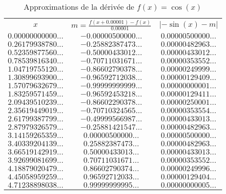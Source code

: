 \begin{table}
\caption{Approximations de la dérivée de $f(x) = \cos(x)$}
\label{TAB_COS_P}
\begin{center}
\begin{tabular}{|c|c|c|}
\cline{1-3}
      $x$                               & $m = \frac{f(x+0.00001)-f(x)}{0.00001}$ &     $|-\sin(x)-m|$                      \\ 
\cline{1-3}
$0.00000000000\ldots$ & $-0.00000500000\ldots$ & $0.00000500000\ldots$ \\ 
$0.26179938780\ldots$ & $-0.25882387473\ldots$ & $0.00000482963\ldots$ \\ 
$0.52359877560\ldots$ & $-0.50000433012\ldots$ & $0.00000433012\ldots$ \\ 
$0.78539816340\ldots$ & $-0.70711031671\ldots$ & $0.00000353552\ldots$ \\ 
$1.04719755120\ldots$ & $-0.86602790378\ldots$ & $0.00000249999\ldots$ \\ 
$1.30899693900\ldots$ & $-0.96592712038\ldots$ & $0.00000129409\ldots$ \\ 
$1.57079632679\ldots$ & $-0.99999999999\ldots$ & $0.00000000001\ldots$ \\ 
$1.83259571459\ldots$ & $-0.96592453218\ldots$ & $0.00000129411\ldots$ \\ 
$2.09439510239\ldots$ & $-0.86602290378\ldots$ & $0.00000250001\ldots$ \\ 
$2.35619449019\ldots$ & $-0.70710324565\ldots$ & $0.00000353554\ldots$ \\ 
$2.61799387799\ldots$ & $-0.49999566987\ldots$ & $0.00000433013\ldots$ \\ 
$2.87979326579\ldots$ & $-0.25881421547\ldots$ & $0.00000482963\ldots$ \\ 
$3.14159265359\ldots$ & $0.00000500000\ldots$ & $0.00000500000\ldots$ \\ 
$3.40339204139\ldots$ & $0.25882387473\ldots$ & $0.00000482963\ldots$ \\ 
$3.66519142919\ldots$ & $0.50000433013\ldots$ & $0.00000433013\ldots$ \\ 
$3.92699081699\ldots$ & $0.70711031671\ldots$ & $0.00000353552\ldots$ \\ 
$4.18879020479\ldots$ & $0.86602790374\ldots$ & $0.00000249996\ldots$ \\ 
$4.45058959259\ldots$ & $0.96592712033\ldots$ & $0.00000129404\ldots$ \\ 
$4.71238898038\ldots$ & $0.99999999995\ldots$ & $0.00000000005\ldots$ \\ 

\end{tabular}
\end{center}
\end{table}

